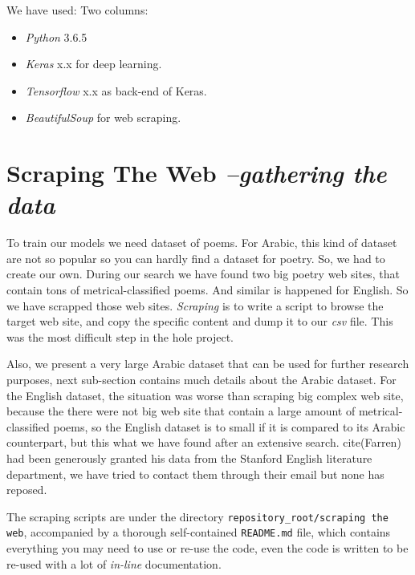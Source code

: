 \documentclass[12pt]{article}
\begin{document}
We have used:
Two columns:
    \begin{multicols}{2}
\begin{itemize}
\item \textit{Python} 3.6.5
\item \textit{Keras} x.x for deep learning.
\item \textit{Tensorflow} x.x as back-end of Keras.
\item \textit{BeautifulSoup} for web scraping.
\end{itemize}
    \end{multicols}







\section{Scraping The Web \textit{\small --gathering the data}}
To train our models we need dataset of poems. For Arabic, this kind of dataset
are not so popular so you can hardly find a dataset for poetry. So, we had to
create our own. During our search we have found two big poetry web sites, that
contain tons of metrical-classified poems. And similar is happened for English.
So we have scrapped those web sites. \textit{Scraping} is to write a script to
browse the target web site, and copy the specific content and dump it to our
\textit{csv} file. This was the most difficult step in the hole project. 
 
Also, we present a very large Arabic dataset that can be used for further
research purposes, next sub-section contains much details about the Arabic
dataset. For the English dataset, the situation was worse than scraping big
complex web site, because the there were not big web site that contain a large
amount of metrical-classified poems, so the English dataset is to small if it is
compared to its Arabic counterpart, but this what we have found after an
extensive search. 
cite(Farren) had been generously granted his data from the
Stanford English literature department, we have tried to contact them through
their email but none has reposed.

The scraping scripts are under the directory \texttt{repository\_root/scraping
the web}, accompanied by  a thorough self-contained \texttt{README.md} file,
which contains everything you may need to use or re-use the code, even the code
is written to be re-used with a lot of  \textit{in-line} documentation.
\end{document}
